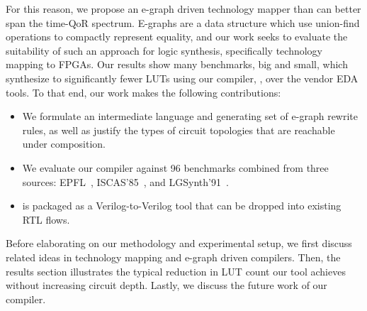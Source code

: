 For this reason, we propose an e-graph driven technology mapper than can better
span the time-QoR spectrum. E-graphs are a data structure which use union-find
operations to compactly represent equality, and our work seeks to evaluate the
suitability of such an approach for logic synthesis, specifically technology
mapping to FPGAs. Our results show many benchmarks, big and small, which
synthesize to significantly fewer LUTs using our compiler, \shortname{}, over
the vendor EDA tools. To that end, our work makes the following contributions:

\begin{itemize}
    \item We formulate an intermediate language and generating set of e-graph rewrite
          rules, as well as justify the types of circuit topologies that are reachable
          under composition.
    \item We evaluate our compiler against 96 benchmarks combined from three sources:
          EPFL~\cite{epflbench}, ISCAS'85~\cite{iscasbench}, and
          LGSynth'91~\cite{lgsynthbench}.
    \item \shortname{} is packaged as a Verilog-to-Verilog tool that can be dropped into existing RTL flows.
\end{itemize}

Before elaborating on our methodology and experimental setup, we first discuss
related ideas in technology mapping and e-graph driven compilers. Then, the
results section illustrates the typical reduction in LUT count our tool
achieves without increasing circuit depth. Lastly, we discuss the future work
of our compiler.